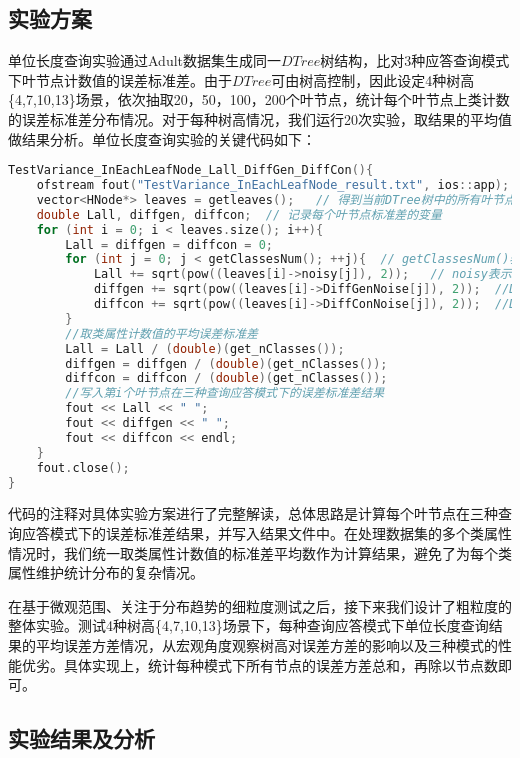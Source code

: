 \subsection{实验方案}
单位长度查询实验通过Adult数据集生成同一$DTree$树结构，比对3种应答查询模式下叶节点计数值的误差标准差。由于$DTree$可由树高控制，因此设定4种树高\{4,7,10,13\}场景，依次抽取20，50，100，200个叶节点，统计每个叶节点上类计数的误差标准差分布情况。对于每种树高情况，我们运行20次实验，取结果的平均值做结果分析。单位长度查询实验的关键代码如下：
\begin{lstlisting}[language={C++}, caption={单位长度查询实验}]
TestVariance_InEachLeafNode_Lall_DiffGen_DiffCon(){
	ofstream fout("TestVariance_InEachLeafNode_result.txt", ios::app);
	vector<HNode*> leaves = getleaves();   // 得到当前DTree树中的所有叶节点
	double Lall, diffgen, diffcon;  // 记录每个叶节点标准差的变量
	for (int i = 0; i < leaves.size(); i++){   
		Lall = diffgen = diffcon = 0;       
		for (int j = 0; j < getClassesNum(); ++j){  // getClassesNum()表示类属性个数，遍历每个类属性
			Lall += sqrt(pow((leaves[i]->noisy[j]), 2));   // noisy表示$\tilde{L}_{all}(D)$方式加的噪音
			diffgen += sqrt(pow((leaves[i]->DiffGenNoise[j]), 2));  //DiffGenNoise表示DiffGen方式加的噪音
			diffcon += sqrt(pow((leaves[i]->DiffConNoise[j]), 2));  //DiffConNoise表示DiffCon方式加的噪音
		}
		//取类属性计数值的平均误差标准差
		Lall = Lall / (double)(get_nClasses());  
		diffgen = diffgen / (double)(get_nClasses());
		diffcon = diffcon / (double)(get_nClasses());
		//写入第i个叶节点在三种查询应答模式下的误差标准差结果
		fout << Lall << " ";  
		fout << diffgen << " ";  
		fout << diffcon << endl; 
	}
	fout.close();
}
\end{lstlisting}
代码的注释对具体实验方案进行了完整解读，总体思路是计算每个叶节点在三种查询应答模式下的误差标准差结果，并写入结果文件中。在处理数据集的多个类属性情况时，我们统一取类属性计数值的标准差平均数作为计算结果，避免了为每个类属性维护统计分布的复杂情况。

在基于微观范围、关注于分布趋势的细粒度测试之后，接下来我们设计了粗粒度的整体实验。测试4种树高\{4,7,10,13\}场景下，每种查询应答模式下单位长度查询结果的平均误差方差情况，从宏观角度观察树高对误差方差的影响以及三种模式的性能优劣。具体实现上，统计每种模式下所有节点的误差方差总和，再除以节点数即可。


\subsection{实验结果及分析}

